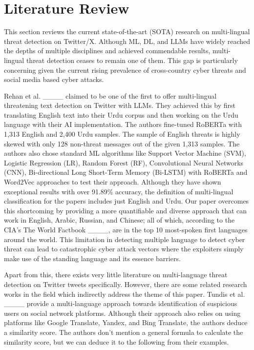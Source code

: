 \section{Literature Review}
\label{literature}

This section reviews the current state-of-the-art (SOTA) research on multi-lingual threat detection on Twitter/X. Although ML, DL, and LLMs have widely reached the depths of multiple disciplines and achieved commendable results, multi-lingual threat detection ceases to remain one of them. This gap is particularly concerning given the current rising prevalence of cross-country cyber threats and social media based cyber attacks.

Rehan et al. ____ claimed to be one of the first to offer multi-lingual threatening text detection on Twitter with LLMs. They achieved this by first translating English text into their Urdu corpus and then working on the Urdu language with their AI implementation. The authors fine-tuned RoBERTa with 1,313 English and 2,400 Urdu samples. The sample of English threats is highly skewed with only 128 non-threat messages out of the given 1,313 samples. The authors also chose standard ML algorithms like Support Vector Machine (SVM), Logistic Regression (LR), Random Forest (RF), Convolutional Neural Networks (CNN), Bi-directional Long Short-Term Memory (Bi-LSTM) with RoBERTa and Word2Vec approaches to test their approach. Although they have shown exceptional results with over 91.89\% accuracy, the definition of multi-lingual classification for the papers includes just English and Urdu. Our paper overcomes this shortcoming by providing a more quantifiable and diverse approach that can work in English, Arabic, Russian, and Chinese; all of which, according to the CIA's The World Factbook ____, are in the top 10 most-spoken first languages around the world. This limitation in detecting multiple language to detect cyber threat can lead to catastrophic cyber attack vectors where the exploiters simply make use of the standing language and its essence barriers.

Apart from this, there exists very little literature on multi-language threat detection on Twitter tweets specifically. However, there are some related research works in the field which indirectly address the theme of this paper. Tundis et al. ____ provide a multi-language approach towards identification of suspicious users on social network platforms. Although their approach also relies on using platforms like Google Translate, Yandex, and Bing Translate, the authors deduce a similarity score. The authors don't mention a general formula to calculate the similarity score, but we can deduce it to the following from their examples.


